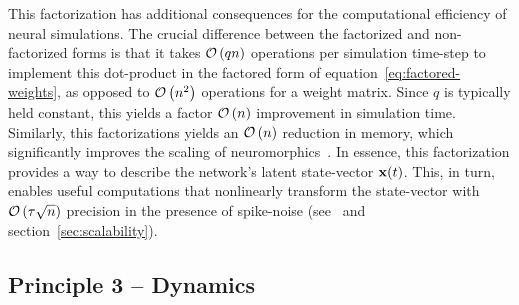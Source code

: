 This factorization has additional consequences for the computational efficiency of neural simulations.
The crucial difference between the factorized and non-factorized forms is that it takes $\mathcal{O}\left({q n}\right)$ operations per simulation time-step to implement this dot-product in the factored form of equation~\ref{eq:factored-weights}, as opposed to $\mathcal{O}\left({ n^2 }\right)$ operations for a weight matrix.
Since $q$ is typically held constant, this yields a factor $\mathcal{O}\left({ n }\right)$ improvement in simulation time.
Similarly, this factorizations yields an $\mathcal{O}\left({ n }\right)$ reduction in memory, which significantly improves the scaling of neuromorphics~\citep{mundy2015}.
In essence, this factorization provides a way to describe the network's latent state-vector $\mathbf{x}(t)$.
This, in turn, enables useful computations that nonlinearly transform the state-vector with $\mathcal{O}\left({ \tau \sqrt{n} }\right)$ precision in the presence of spike-noise (see~\citet[][p.~47]{eliasmith2003a} and section~\ref{sec:scalability}).

\subsection{Principle 3 -- Dynamics}
\label{sec:principle3}

